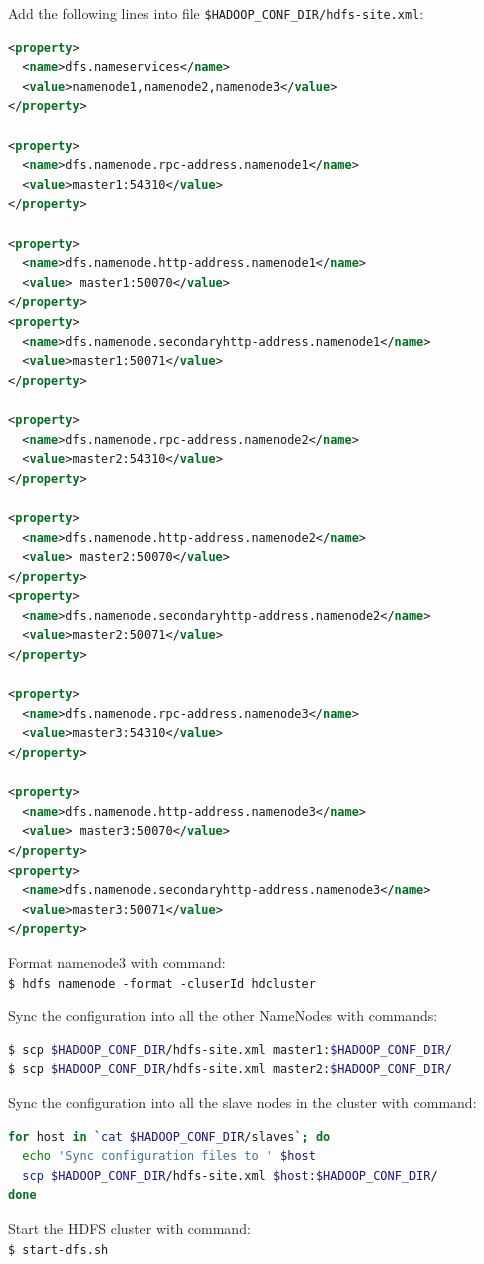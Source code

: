 Add the following lines into file \verb|$HADOOP_CONF_DIR/hdfs-site.xml|:
\lstset{style=bashstyle}
\begin{lstlisting}[language=XML]
<property>
  <name>dfs.nameservices</name>
  <value>namenode1,namenode2,namenode3</value>
</property>

<property>
  <name>dfs.namenode.rpc-address.namenode1</name>
  <value>master1:54310</value>
</property>

<property>
  <name>dfs.namenode.http-address.namenode1</name>
  <value> master1:50070</value>
</property>
<property>
  <name>dfs.namenode.secondaryhttp-address.namenode1</name>
  <value>master1:50071</value>
</property>

<property>
  <name>dfs.namenode.rpc-address.namenode2</name>
  <value>master2:54310</value>
</property>

<property>
  <name>dfs.namenode.http-address.namenode2</name>
  <value> master2:50070</value>
</property>
<property>
  <name>dfs.namenode.secondaryhttp-address.namenode2</name>
  <value>master2:50071</value>
</property>

<property>
  <name>dfs.namenode.rpc-address.namenode3</name>
  <value>master3:54310</value>
</property>

<property>
  <name>dfs.namenode.http-address.namenode3</name>
  <value> master3:50070</value>
</property>
<property>
  <name>dfs.namenode.secondaryhttp-address.namenode3</name>
  <value>master3:50071</value>
</property>
\end{lstlisting}

Format namenode3 with command: \\
\verb|$ hdfs namenode -format -cluserId hdcluster|

Sync the configuration into all the other NameNodes with commands:
\lstset{style=bashstyle}
\begin{lstlisting}[language=bash]
$ scp $HADOOP_CONF_DIR/hdfs-site.xml master1:$HADOOP_CONF_DIR/
$ scp $HADOOP_CONF_DIR/hdfs-site.xml master2:$HADOOP_CONF_DIR/
\end{lstlisting}

Sync the configuration into all the slave nodes in the cluster with command:
\lstset{style=bashstyle}
\begin{lstlisting}[language=bash]
for host in `cat $HADOOP_CONF_DIR/slaves`; do
  echo 'Sync configuration files to ' $host
  scp $HADOOP_CONF_DIR/hdfs-site.xml $host:$HADOOP_CONF_DIR/
done
\end{lstlisting}

Start the HDFS cluster with command: \\
\verb|$ start-dfs.sh|

